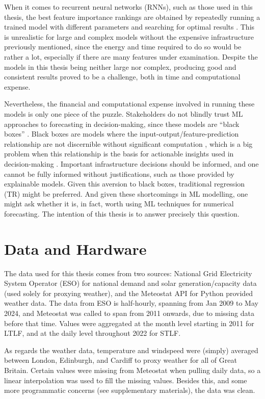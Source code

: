 \documentclass[12pt]{scrreprt}
\begin{document}
When it comes to recurrent neural networks (RNNs), such as those used in this thesis, the best feature importance rankings are obtained by repeatedly running a trained model with different parameters and searching for optimal results \cite{Zien09, Wojtas20}. This is unrealistic for large and complex models without the expensive infrastructure previously mentioned, since the energy and time required to do so would be rather a lot, especially if there are many features under examination. Despite the models in this thesis being neither large nor complex, producing good and consistent results proved to be a challenge, both in time and computational expense.

Nevertheless, the financial and computational expense involved in running these models is only one piece of the puzzle. Stakeholders do not blindly trust ML approaches to forecasting in decision-making, since these models are ``black boxes'' \cite{Hoepner21}. Black boxes are models where the input-output/feature-prediction relationship are not discernible without significant computation \cite{Zien09, Wojtas20}, which is a big problem when this relationship is the basis for actionable insights used in decision-making \cite{Hoepner21}. Important infrastructure decisions should be informed, and one cannot be fully informed without justifications, such as those provided by explainable models. Given this aversion to black boxes, traditional regression (TR) might be preferred. And given these shortcomings in ML modelling, one might ask whether it is, in fact, worth using ML techniques for numerical forecasting. The intention of this thesis is to answer precisely this question.

\chapter{Data and Hardware}

The data used for this thesis comes from two sources: National Grid Electricity System Operator (ESO) for national demand and solar generation/capacity data (used solely for proxying weather), and the Meteostat API for Python provided weather data. The data from ESO is half-hourly, spanning from Jan 2009 to May 2024, and Meteostat was called to span from 2011 onwards, due to missing data before that time. Values were aggregated at the month level starting in 2011 for LTLF, and at the daily level throughout 2022 for STLF.

As regards the weather data, temperature and windspeed were (simply) averaged between London, Edinburgh, and Cardiff to proxy weather for all of Great Britain. Certain values were missing from Meteostat when pulling daily data, so a linear interpolation was used to fill the missing values. Besides this, and some more programmatic concerns (see supplementary materials), the data was clean. 
\end{document}
